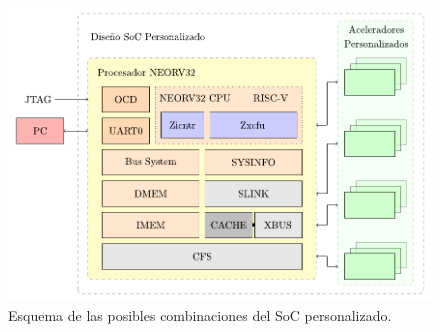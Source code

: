 \begin{figure}[H]
    \centering
    \includegraphics[width=14cm]{Figuras/scheme.pdf}
    \caption{Esquema de las posibles combinaciones del SoC personalizado.}
    \label{fig:soc}
\end{figure}

